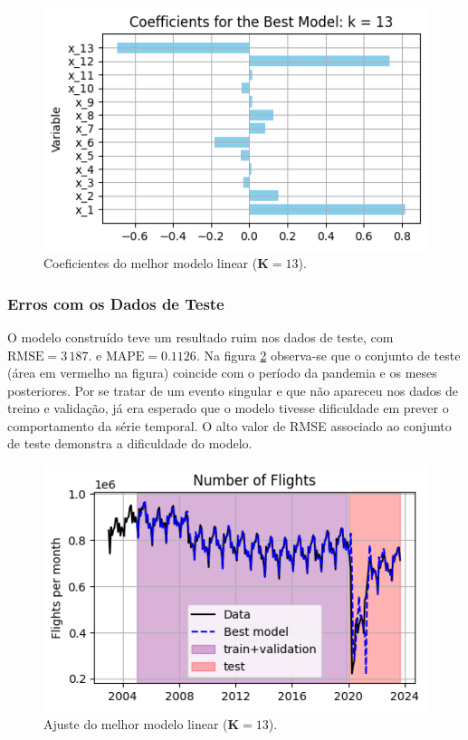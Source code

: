 \documentclass[final,5p]{elsarticle}
\numberwithin{equation}{section}
\begin{document}
    \begin{figure}[hbt!]
        \includegraphics[width=0.95\columnwidth]{B1_CoefficientsNoScaling.png}
        \caption{Coeficientes do melhor modelo linear ($\textbf{K} = 13$).}
        \label{fig:coef_modelo_linear}
    \end{figure}


    \subsubsection{Erros com os Dados de Teste} \label{sec:testes_modelo}

    O modelo construído teve um resultado ruim nos dados de teste, com $\text{RMSE} = 3\,187.$ e $\text{MAPE} = 0.1126$. Na figura \ref{fig:melhor_modelo_teste} observa-se que o conjunto de teste (área em vermelho na figura) coincide com o período da pandemia e os meses posteriores. Por se tratar de um evento singular e que não apareceu nos dados de treino e validação, já era esperado que o modelo tivesse dificuldade em prever o comportamento da série temporal. O alto valor de RMSE associado ao conjunto de teste demonstra a dificuldade do modelo.

    \begin{figure}[hbt!]
        \includegraphics[width=0.95\columnwidth]{B2_BestModelFit.png}
        \caption{Ajuste do melhor modelo linear ($\textbf{K} = 13$).}
        \label{fig:melhor_modelo_teste}
    \end{figure}
\end{document}
